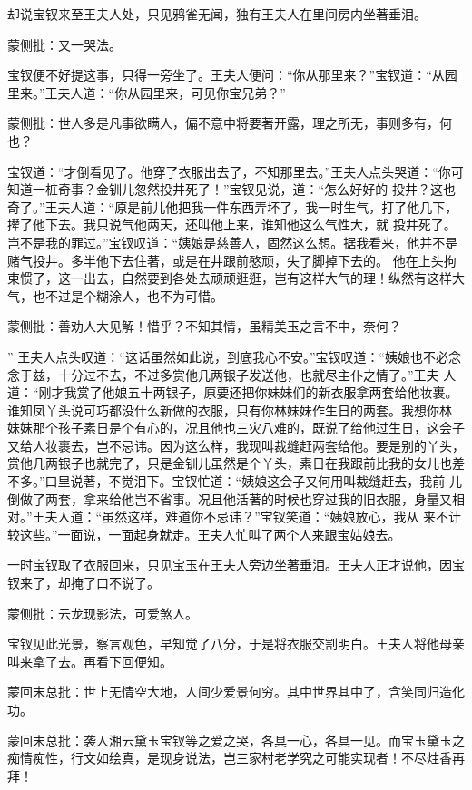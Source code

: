 \begin{parag}


    却说宝钗来至王夫人处，只见鸦雀无闻，独有王夫人在里间房内坐著垂泪。\begin{note}蒙侧批：又一哭法。\end{note}宝钗便不好提这事，只得一旁坐了。王夫人便问：“你从那里来？”宝钗道：“从园里来。”王夫人道：“你从园里来，可见你宝兄弟？”\begin{note}蒙侧批：世人多是凡事欲瞒人，偏不意中将要著开露，理之所无，事则多有，何 也？\end{note}宝钗道：“才倒看见了。他穿了衣服出去了，不知那里去。”王夫人点头哭道：“你可知道一桩奇事？金钏儿忽然投井死了！”宝钗见说，道：“怎么好好的 投井？这也奇了。”王夫人道：“原是前儿他把我一件东西弄坏了，我一时生气，打了他几下，撵了他下去。我只说气他两天，还叫他上来，谁知他这么气性大，就 投井死了。岂不是我的罪过。”宝钗叹道：“姨娘是慈善人，固然这么想。据我看来，他并不是赌气投井。多半他下去住著，或是在井跟前憨顽，失了脚掉下去的。 他在上头拘束惯了，这一出去，自然要到各处去顽顽逛逛，岂有这样大气的理！纵然有这样大气，也不过是个糊涂人，也不为可惜。\begin{note}蒙侧批：善劝人大见解！惜乎？不知其情，虽精美玉之言不中，奈何？\end{note}” 王夫人点头叹道：“这话虽然如此说，到底我心不安。”宝钗叹道：“姨娘也不必念念于兹，十分过不去，不过多赏他几两银子发送他，也就尽主仆之情了。”王夫 人道：“刚才我赏了他娘五十两银子，原要还把你妹妹们的新衣服拿两套给他妆裹。谁知凤丫头说可巧都没什么新做的衣服，只有你林妹妹作生日的两套。我想你林 妹妹那个孩子素日是个有心的，况且他也三灾八难的，既说了给他过生日，这会子又给人妆裹去，岂不忌讳。因为这么样，我现叫裁缝赶两套给他。要是别的丫头， 赏他几两银子也就完了，只是金钏儿虽然是个丫头，素日在我跟前比我的女儿也差不多。”口里说著，不觉泪下。宝钗忙道：“姨娘这会子又何用叫裁缝赶去，我前 儿倒做了两套，拿来给他岂不省事。况且他活著的时候也穿过我的旧衣服，身量又相对。”王夫人道：“虽然这样，难道你不忌讳？”宝钗笑道：“姨娘放心，我从 来不计较这些。”一面说，一面起身就走。王夫人忙叫了两个人来跟宝姑娘去。
\end{parag}


\begin{parag}


    一时宝钗取了衣服回来，只见宝玉在王夫人旁边坐著垂泪。王夫人正才说他，因宝钗来了，却掩了口不说了。\begin{note}蒙侧批：云龙现影法，可爱煞人。\end{note}宝钗见此光景，察言观色，早知觉了八分，于是将衣服交割明白。王夫人将他母亲叫来拿了去。再看下回便知。
\end{parag}

\begin{parag}

    \begin{note}蒙回末总批：世上无情空大地，人间少爱景何穷。其中世界其中了，含笑同归造化功。\end{note}
\end{parag}


\begin{parag}


    \begin{note}蒙回末总批：袭人湘云黛玉宝钗等之爱之哭，各具一心，各具一见。而宝玉黛玉之痴情痴性，行文如绘真，是现身说法，岂三家村老学究之可能实现者！不尽炷香再拜！\end{note}
\end{parag}

